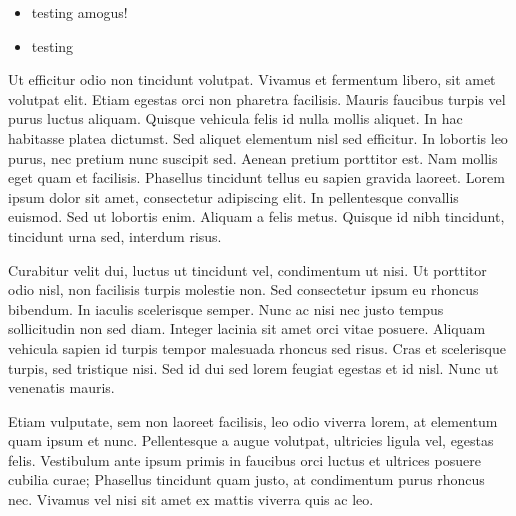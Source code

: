 \documentclass{article}
\begin{document}
\begin{multicols}{2}
        \begin{itemize}
            \item testing
                amogus!
            \item testing
        \end{itemize}

        Ut efficitur odio non tincidunt volutpat. Vivamus et fermentum libero, sit amet volutpat elit. Etiam egestas orci non pharetra facilisis. Mauris faucibus turpis vel purus luctus aliquam. Quisque vehicula felis id nulla mollis aliquet. In hac habitasse platea dictumst. Sed aliquet elementum nisl sed efficitur. In lobortis leo purus, nec pretium nunc suscipit sed. Aenean pretium porttitor est. Nam mollis eget quam et facilisis. Phasellus tincidunt tellus eu sapien gravida laoreet. Lorem ipsum dolor sit amet, consectetur adipiscing elit. In pellentesque convallis euismod. Sed ut lobortis enim. Aliquam a felis metus. Quisque id nibh tincidunt, tincidunt urna sed, interdum risus.

        Curabitur velit dui, luctus ut tincidunt vel, condimentum ut nisi. Ut porttitor odio nisl, non facilisis turpis molestie non. Sed consectetur ipsum eu rhoncus bibendum. In iaculis scelerisque semper. Nunc ac nisi nec justo tempus sollicitudin non sed diam. Integer lacinia sit amet orci vitae posuere. Aliquam vehicula sapien id turpis tempor malesuada rhoncus sed risus. Cras et scelerisque turpis, sed tristique nisi. Sed id dui sed lorem feugiat egestas et id nisl. Nunc ut venenatis mauris.

        Etiam vulputate, sem non laoreet facilisis, leo odio viverra lorem, at elementum quam ipsum et nunc. Pellentesque a augue volutpat, ultricies ligula vel, egestas felis. Vestibulum ante ipsum primis in faucibus orci luctus et ultrices posuere cubilia curae; Phasellus tincidunt quam justo, at condimentum purus rhoncus nec. Vivamus vel nisi sit amet ex mattis viverra quis ac leo.
    \end{multicols}
\end{document}
